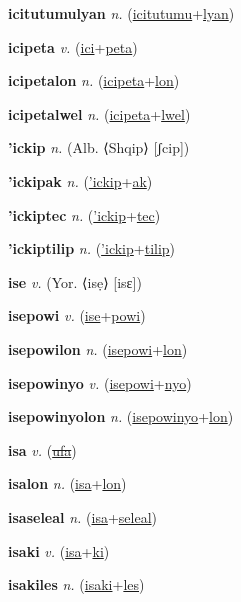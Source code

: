 \textbf{\hypertarget{icitutumulyan}{icitutumulyan}} \textit{n.} (\hyperlink{icitutumu}{icitutumu}+\allowbreak \hyperlink{lyan}{lyan})


\textbf{\hypertarget{icipeta}{icipeta}} \textit{v.} (\hyperlink{ici}{ici}+\allowbreak \hyperlink{peta}{peta})


\textbf{\hypertarget{icipetalon}{icipetalon}} \textit{n.} (\hyperlink{icipeta}{icipeta}+\allowbreak \hyperlink{lon}{lon})


\textbf{\hypertarget{icipetalwel}{icipetalwel}} \textit{n.} (\hyperlink{icipeta}{icipeta}+\allowbreak \hyperlink{lwel}{lwel})


\textbf{\hypertarget{'ickip}{'ickip}} \textit{n.} (Alb. ⟨Shqip⟩ [ʃcip])


\textbf{\hypertarget{'ickipak}{'ickipak}} \textit{n.} (\hyperlink{'ickip}{'ickip}+\allowbreak \hyperlink{ak}{ak})


\textbf{\hypertarget{'ickiptec}{'ickiptec}} \textit{n.} (\hyperlink{'ickip}{'ickip}+\allowbreak \hyperlink{tec}{tec})


\textbf{\hypertarget{'ickiptilip}{'ickiptilip}} \textit{n.} (\hyperlink{'ickip}{'ickip}+\allowbreak \hyperlink{tilip}{tilip})


\textbf{\hypertarget{ise}{ise}} \textit{v.} (Yor. ⟨isẹ⟩ [isɛ])


\textbf{\hypertarget{isepowi}{isepowi}} \textit{v.} (\hyperlink{ise}{ise}+\allowbreak \hyperlink{powi}{powi})


\textbf{\hypertarget{isepowilon}{isepowilon}} \textit{n.} (\hyperlink{isepowi}{isepowi}+\allowbreak \hyperlink{lon}{lon})


\textbf{\hypertarget{isepowinyo}{isepowinyo}} \textit{v.} (\hyperlink{isepowi}{isepowi}+\allowbreak \hyperlink{nyo}{nyo})


\textbf{\hypertarget{isepowinyolon}{isepowinyolon}} \textit{n.} (\hyperlink{isepowinyo}{isepowinyo}+\allowbreak \hyperlink{lon}{lon})


\textbf{\hypertarget{isa}{isa}} \textit{v.} (\hyperlink{ufa}{\sout{ufa}})


\textbf{\hypertarget{isalon}{isalon}} \textit{n.} (\hyperlink{isa}{isa}+\allowbreak \hyperlink{lon}{lon})


\textbf{\hypertarget{isaseleal}{isaseleal}} \textit{n.} (\hyperlink{isa}{isa}+\allowbreak \hyperlink{seleal}{seleal})


\textbf{\hypertarget{isaki}{isaki}} \textit{v.} (\hyperlink{isa}{isa}+\allowbreak \hyperlink{ki}{ki})


\textbf{\hypertarget{isakiles}{isakiles}} \textit{n.} (\hyperlink{isaki}{isaki}+\allowbreak \hyperlink{les}{les})


